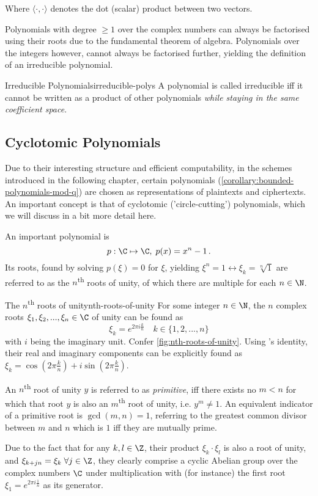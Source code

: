Where $\langle \cdot, \cdot \rangle$ denotes the dot (scalar) product between two vectors.

Polynomials with degree $\geq 1$ over the complex numbers can always be factorised using their roots due to the fundamental theorem of algebra.
Polynomials over the integers however, cannot always be factorised further, yielding the definition of an irreducible polynomial.

\begin{definition}{Irreducible Polynomials}{irreducible-polys}
  A polynomial is called irreducible \gls{iff} it cannot be written as a product of other polynomials \textsl{while staying in the same coefficient space}.
\end{definition}

\subsection{Cyclotomic Polynomials}
Due to their interesting structure and efficient computability, in the schemes introduced in the following chapter, certain polynomials (\cref{corollary:bounded-polynomials-mod-q}) are chosen as representations of plaintexts and ciphertexts.
An important concept is that of cyclotomic ('circle-cutting') polynomials, which we will discuss in a bit more detail here.

An important polynomial is $$p: \C \mapsto \C, \; p(x) = x^n - 1 \,.$$
Its roots, found by solving $p(\xi) = 0$ for $\xi$, yielding $\xi^n = 1 \leftrightarrow \xi_k = \sqrt[n]{1}$ are referred to as the $n$\textsuperscript{th} roots of unity, of which there are multiple for each $n \in \N$.

\begin{lemma}{The $n$\textsuperscript{th} roots of unity}{nth-roots-of-unity}
  For some integer $n \in \N$, the $n$ complex roots $\xi_1, \xi_2, ..., \xi_n \in \C$ of unity can be found as $$\xi_k = e^{2\pi i \frac{k}{n}} \quad k \in \{1, 2, ..., n\}$$ with $i$ being the imaginary unit.
  Confer \cref{fig:nth-roots-of-unity}.
  Using 's identity, their real and imaginary components can be explicitly found as $\xi_k = \cos(2\pi \frac{k}{n}) + i \sin(2\pi \frac{k}{n})$.

  An $n$\textsuperscript{th} root of unity $y$ is referred to as \textit{primitive}, \gls{iff} there exists no $m < n$ for which that root $y$ is also an $m$\textsuperscript{th} root of unity, i.e. $y^m \neq 1$.
  An equivalent indicator of a primitive root is $\gcd(m, n) = 1$, referring to the greatest common divisor between $m$ and $n$ which is $1$ \gls{iff} they are mutually prime.
\end{lemma}
Due to the fact that for any $k, l \in \Z$, their product $\xi_k \cdot \xi_l$ is also a root of unity, and $\xi_{k+jn} = \xi_k \; \forall j \in \Z$, they clearly comprise a cyclic Abelian group over the complex numbers $\C$ under multiplication with (for instance) the first root $\xi_1 = e^{2\pi i \frac{1}{n}}$ as its generator.

